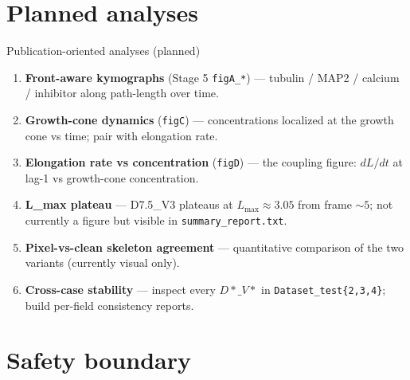 \documentclass[aspectratio=169]{beamer}
\begin{document}
\section{Planned analyses}

\begin{frame}{Publication-oriented analyses (planned)}
\begin{enumerate}
  \item \textbf{Front-aware kymographs} (Stage 5 \texttt{figA\_*}) ---
        tubulin / MAP2 / calcium / inhibitor along path-length over time.
  \item \textbf{Growth-cone dynamics} (\texttt{figC}) --- concentrations
        localized at the growth cone vs time; pair with elongation rate.
  \item \textbf{Elongation rate vs concentration} (\texttt{figD}) --- the
        coupling figure: \(dL/dt\) at lag-1 vs growth-cone concentration.
  \item \textbf{L\_max plateau} --- D7.5\_V3 plateaus at \(L_{\max}\approx 3.05\)
        from frame \(\sim 5\); not currently a figure but visible in
        \texttt{summary\_report.txt}.
  \item \textbf{Pixel-vs-clean skeleton agreement} --- quantitative comparison
        of the two variants (currently visual only).
  \item \textbf{Cross-case stability} --- inspect every \(D*\_V*\) in
        \texttt{Dataset\_test\{2,3,4\}}; build per-field consistency reports.
\end{enumerate}
\end{frame}

\section{Safety boundary}
\end{document}
